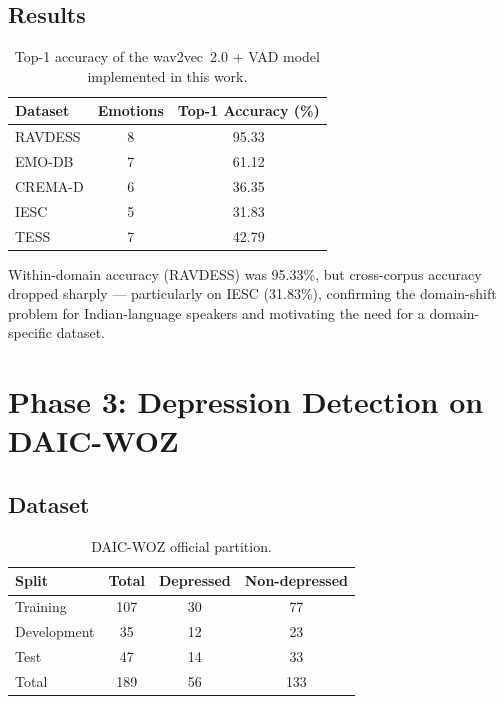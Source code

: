 \subsection{Results}

\begin{table}[h]
\centering
\caption{Top-1 accuracy of the wav2vec~2.0 + VAD model implemented in this work.}
\label{tab:wav2vec_results}
\begin{tabular}{@{}lcc@{}}
\toprule
\textbf{Dataset} & \textbf{Emotions} & \textbf{Top-1 Accuracy (\%)} \\
\midrule
RAVDESS  & 8 & 95.33 \\
EMO-DB   & 7 & 61.12 \\
CREMA-D  & 6 & 36.35 \\
IESC     & 5 & 31.83 \\
TESS     & 7 & 42.79 \\
\bottomrule
\end{tabular}
\end{table}

Within-domain accuracy (RAVDESS) was 95.33\%, but cross-corpus accuracy dropped sharply — particularly on IESC (31.83\%), confirming the domain-shift problem for Indian-language speakers and motivating the need for a domain-specific dataset.

\section{Phase 3: Depression Detection on DAIC-WOZ}

\subsection{Dataset}

\begin{table}[h]
\centering
\caption{DAIC-WOZ official partition.}
\label{tab:daic_split}
\begin{tabular}{@{}lccc@{}}
\toprule
\textbf{Split} & \textbf{Total} & \textbf{Depressed} & \textbf{Non-depressed} \\
\midrule
Training    & 107 & 30  & 77  \\
Development & 35  & 12  & 23  \\
Test        & 47  & 14  & 33  \\
\midrule
Total       & 189 & 56  & 133 \\
\bottomrule
\end{tabular}
\end{table}

